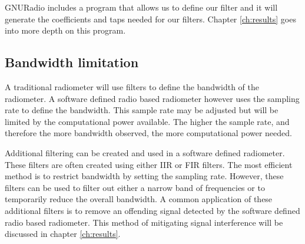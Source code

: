 


GNURadio includes a program that allows us to define our filter and it will generate the coefficients and taps needed for our filters.  Chapter \ref{ch:results} goes into more depth on this program.



\subsection{Bandwidth limitation}
A traditional radiometer will use filters to define the bandwidth of the radiometer.  A software defined radio based radiometer however uses the sampling rate to define the bandwidth.  This sample rate may be adjusted but will be limited by the computational power available.  The higher the sample rate, and therefore the more bandwidth observed, the more computational power needed.  

Additional filtering can be created and used in a software defined radiometer.  These filters are often created using either IIR or FIR filters.  The most efficient method is to restrict bandwidth by setting the sampling rate.  However, these filters can be used to filter out either a narrow band of frequencies or to temporarily reduce the overall bandwidth.  A common application of these additional filters is to remove an offending signal detected by the software defined radio based radiometer.  This method of mitigating signal interference will be discussed in chapter \ref{ch:results}.

